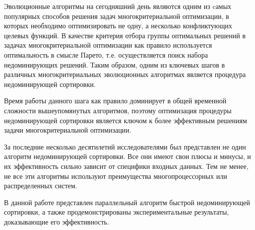 \startprefacepage
Эволюционные алгоритмы на сегодняшний день являются одним из cамых популярных способов решения задач многокритериальной оптимизации, в которых необходимо оптимизировать не одну, а несколько конфликтующих целевых функций. В качестве критерия отбора группы оптимальных решений в задачах многокритериальной оптимизации как правило используется оптимальность в смысле Парето, т.е. осуществляется поиск набора недоминирующих решений. Таким образом, одним из ключевых шагов в различных многокритериальных эволюционных алгоритмах является процедура недоминирующей сортировки.

Время работы данного шага как правило доминирует в общей временной сложности вышеупомянутых алгоритмов, поэтому оптимизация процедуры недоминирующей сортировки является ключом к более эффективным решениям задачи многокритериальной оптимизации.

За последние несколько десятилетий исследователями был представлен не один алгоритм недоминирующей сортировки. Все они имеют свои плюсы и минусы, и их эффективность сильно зависит от специфики входных данных. Тем не менее, не все эти алгоритмы используют преимущества многопроцессорных или распределенных систем.

В данной работе представлен параллельный алгоритм быстрой недоминирующей сортировки, а также продемонстрированы экспериментальные результаты, доказывающие его эффективность.
